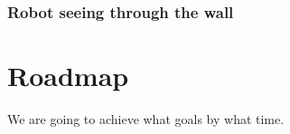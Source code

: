 \documentclass{article}
\begin{document}
\subsubsection{Robot seeing through the wall}


\section{Roadmap}
\label{sec:roadmap}

We are going to achieve what goals by what time.





\small



\end{document}
